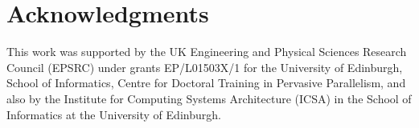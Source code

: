 \documentclass[sigplan,10pt]{acmart}
\theoremstyle{definition}
\begin{document}
\section*{Acknowledgments}

This work was supported by the UK Engineering
and Physical Sciences Research Council (EPSRC) under grants
EP/L01503X/1 for the University of Edinburgh, School
of Informatics, Centre for Doctoral Training in Pervasive
Parallelism, %
and also by the Institute for Computing Systems Architecture (ICSA)
in the School of Informatics at the University of Edinburgh.


 
\end{document}
